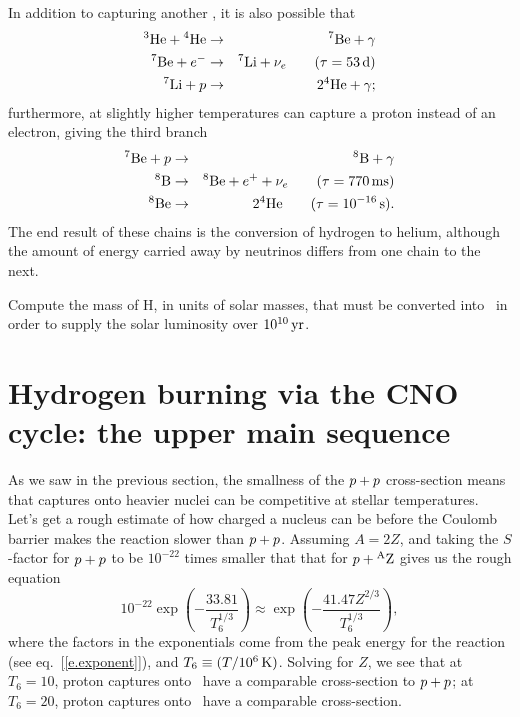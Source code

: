 In addition to capturing another \helium[3], it is also possible that
\begin{eqnarray}
\helium[3] + \helium &\to& \beryllium[7] + \gamma\nonumber\\
 \beryllium[7] + e^{-} &\to& \lithium[7] +  \nu_{e}\qquad(\tau=53\nsp\unitstyle{d})\nonumber \\
 \lithium[7] + \pt &\to& 2\helium + \gamma;
 \end{eqnarray}
furthermore, at slightly higher temperatures \beryllium[7] can capture a proton instead of an electron, giving the third branch
\begin{eqnarray}
\beryllium[7] + \pt &\to& \boron[8] + \gamma\nonumber\\
\boron[8] &\to& \beryllium[8] + e^{+} + \nu_{e}\qquad(\tau = 770\nsp\milli\second)\nonumber\\
\beryllium[8] &\to& 2\helium\qquad(\tau=10^{-16}\nsp\second).
\end{eqnarray}
 The end result of these chains is the conversion of hydrogen to helium, although the amount of energy carried away by neutrinos differs from one chain to the next.


\begin{exercisebox}
 Compute the mass of H, in units of solar masses, that must be converted into \helium\ in order to supply the solar luminosity over $10^{10}\nsp\yr$.
\end{exercisebox}

\section[The CNO cycle]{Hydrogen burning via the CNO cycle: the upper main sequence}
\label{s.upper-ms}

As we saw in the previous section, the smallness of the $\pt+\pt$ cross-section means that captures onto heavier nuclei can be competitive at stellar temperatures.  Let's get a rough estimate of how charged a nucleus can be before the Coulomb barrier makes the reaction slower than $\pt+\pt$.  Assuming $A = 2Z$, and taking the $S$-factor for $\pt+\pt$ to be $10^{-22}$ times smaller that that for $\pt + \mathrm{^{A}Z}$ gives us the rough equation
\[ 10^{-22}\exp\left(-\frac{33.81}{T_{6}^{1/3}}\right) \approx \exp\left(-\frac{41.47 Z^{2/3}}{T_{6}^{1/3}}\right), \]
where the factors in the exponentials come from the peak energy for the reaction (see eq.~[\ref{e.exponent}]), and $T_{6}\equiv (T/10^{6}\nsp\K)$.  Solving for $Z$, we see that at $T_{6} = 10$, proton captures onto \carbon\ have a comparable cross-section to $\pt + \pt$; at $T_{6} = 20$, proton captures onto \oxygen\ have a comparable cross-section.

